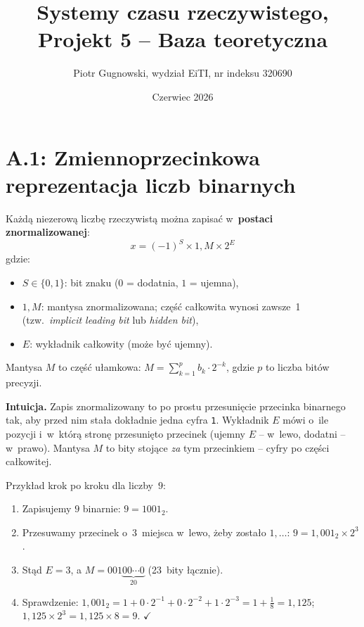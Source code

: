 \documentclass[12pt,a4paper]{article}
\title{Systemy czasu rzeczywistego, Projekt 5 -- Baza teoretyczna}
\author{Piotr Gugnowski, wydział EiTI, nr indeksu 320690}
\date{Czerwiec 2026}
\begin{document}
\maketitle

\section*{A.1: Zmiennoprzecinkowa reprezentacja liczb binarnych}

Każdą niezerową liczbę rzeczywistą można zapisać w~\textbf{postaci znormalizowanej}:
\[
  x = (-1)^S \times 1{,}M \times 2^E
\]
gdzie:
\begin{itemize}
  \item $S \in \{0, 1\}$: bit znaku ($0$ = dodatnia, $1$ = ujemna),
  \item $1{,}M$: mantysa znormalizowana; część całkowita wynosi zawsze~1
        (tzw.\ \textit{implicit leading bit} lub \textit{hidden bit}),
  \item $E$: wykładnik całkowity (może być ujemny).
\end{itemize}

Mantysa $M$ to część ułamkowa: $M = \sum_{k=1}^{p} b_k \cdot 2^{-k}$,
gdzie $p$ to liczba bitów precyzji.

\medskip
\noindent\textbf{Intuicja.}
Zapis znormalizowany to po prostu przesunięcie przecinka binarnego tak,
aby przed nim stała dokładnie jedna cyfra \texttt{1}.
Wykładnik $E$ mówi o~ile pozycji i~w~którą stronę przesunięto przecinek
(ujemny $E$ -- w~lewo, dodatni -- w~prawo).
Mantysa $M$ to bity stojące \emph{za} tym przecinkiem -- cyfry po części całkowitej.

Przykład krok po kroku dla liczby~$9$:
\begin{enumerate}
  \item Zapisujemy $9$ binarnie: $9 = 1001_2$.
  \item Przesuwamy przecinek o~3~miejsca w~lewo, żeby zostało $1{,}\ldots$:
        $9 = 1{,}001_2 \times 2^3$.
  \item Stąd $E = 3$, a $M = 001\underbrace{00\cdots0}_{20}$ (23~bity łącznie).
  \item Sprawdzenie: $1{,}001_2 = 1 + 0{\cdot}2^{-1} + 0{\cdot}2^{-2} + 1{\cdot}2^{-3}
        = 1 + \tfrac{1}{8} = 1{,}125$;\quad
        $1{,}125 \times 2^3 = 1{,}125 \times 8 = 9$. $\checkmark$
\end{enumerate}
\end{document}
